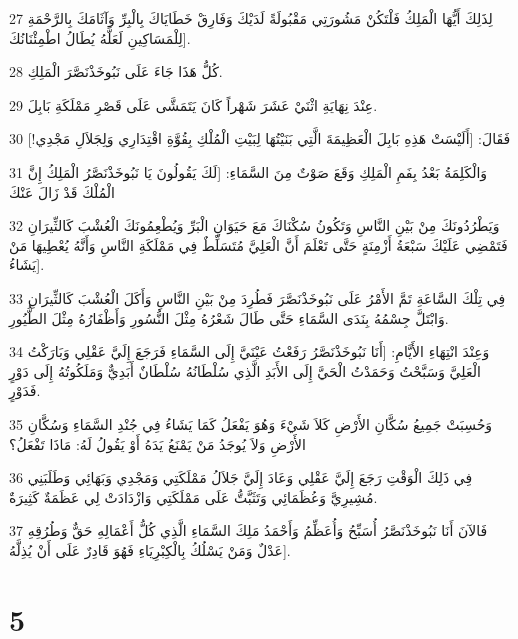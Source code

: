 \par 27 لِذَلِكَ أَيُّهَا الْمَلِكُ فَلْتَكُنْ مَشُورَتِي مَقْبُولَةً لَدَيْكَ وَفَارِقْ خَطَايَاكَ بِالْبِرِّ وَآثَامَكَ بِالرَّحْمَةِ لِلْمَسَاكِينِ لَعَلَّهُ يُطَالُ اطْمِئْنَانُكَ].
\par 28 كُلُّ هَذَا جَاءَ عَلَى نَبُوخَذْنَصَّرَ الْمَلِكِ.
\par 29 عِنْدَ نِهَايَةِ اثْنَيْ عَشَرَ شَهْراً كَانَ يَتَمَشَّى عَلَى قَصْرِ مَمْلَكَةِ بَابِلَ.
\par 30 فَقَالَ: [أَلَيْسَتْ هَذِهِ بَابِلَ الْعَظِيمَةَ الَّتِي بَنَيْتُهَا لِبَيْتِ الْمُلْكِ بِقُوَّةِ اقْتِدَارِي وَلِجَلاَلِ مَجْدِي!]
\par 31 وَالْكَلِمَةُ بَعْدُ بِفَمِ الْمَلِكِ وَقَعَ صَوْتٌ مِنَ السَّمَاءِ: [لَكَ يَقُولُونَ يَا نَبُوخَذْنَصَّرُ الْمَلِكُ إِنَّ الْمُلْكَ قَدْ زَالَ عَنْكَ
\par 32 وَيَطْرُدُونَكَ مِنْ بَيْنِ النَّاسِ وَتَكُونُ سُكْنَاكَ مَعَ حَيَوَانِ الْبَرِّ وَيُطْعِمُونَكَ الْعُشْبَ كَالثِّيرَانِ فَتَمْضِي عَلَيْكَ سَبْعَةُ أَزْمِنَةٍ حَتَّى تَعْلَمَ أَنَّ الْعَلِيَّ مُتَسَلِّطٌ فِي مَمْلَكَةِ النَّاسِ وَأَنَّهُ يُعْطِيهَا مَنْ يَشَاءُ].
\par 33 فِي تِلْكَ السَّاعَةِ تَمَّ الأَمْرُ عَلَى نَبُوخَذْنَصَّرَ فَطُرِدَ مِنْ بَيْنِ النَّاسِ وَأَكَلَ الْعُشْبَ كَالثِّيرَانِ وَابْتَلَّ جِسْمُهُ بِنَدَى السَّمَاءِ حَتَّى طَالَ شَعْرُهُ مِثْلَ النُّسُورِ وَأَظْفَارُهُ مِثْلَ الطُّيُورِ.
\par 34 وَعِنْدَ انْتِهَاءِ الأَيَّامِ: [أَنَا نَبُوخَذْنَصَّرُ رَفَعْتُ عَيْنَيَّ إِلَى السَّمَاءِ فَرَجَعَ إِلَيَّ عَقْلِي وَبَارَكْتُ الْعَلِيَّ وَسَبَّحْتُ وَحَمَدْتُ الْحَيَّ إِلَى الأَبَدِ الَّذِي سُلْطَانُهُ سُلْطَانٌ أَبَدِيٌّ وَمَلَكُوتُهُ إِلَى دَوْرٍ فَدَوْرٍ.
\par 35 وَحُسِبَتْ جَمِيعُ سُكَّانِ الأَرْضِ كَلاَ شَيْءَ وَهُوَ يَفْعَلُ كَمَا يَشَاءُ فِي جُنْدِ السَّمَاءِ وَسُكَّانِ الأَرْضِ وَلاَ يُوجَدُ مَنْ يَمْنَعُ يَدَهُ أَوْ يَقُولُ لَهُ: مَاذَا تَفْعَلُ؟
\par 36 فِي ذَلِكَ الْوَقْتِ رَجَعَ إِلَيَّ عَقْلِي وَعَادَ إِلَيَّ جَلاَلُ مَمْلَكَتِي وَمَجْدِي وَبَهَائِي وَطَلَبَنِي مُشِيرِيَّ وَعُظَمَائِي وَتَثَبَّتُّ عَلَى مَمْلَكَتِي وَازْدَادَتْ لِي عَظَمَةٌ كَثِيرَةٌ.
\par 37 فَالآنَ أَنَا نَبُوخَذْنَصَّرُ أُسَبِّحُ وَأُعَظِّمُ وَأَحْمَدُ مَلِكَ السَّمَاءِ الَّذِي كُلُّ أَعْمَالِهِ حَقٌّ وَطُرُقِهِ عَدْلٌ وَمَنْ يَسْلُكُ بِالْكِبْرِيَاءِ فَهُوَ قَادِرٌ عَلَى أَنْ يُذِلَّهُ].

\chapter{5}

